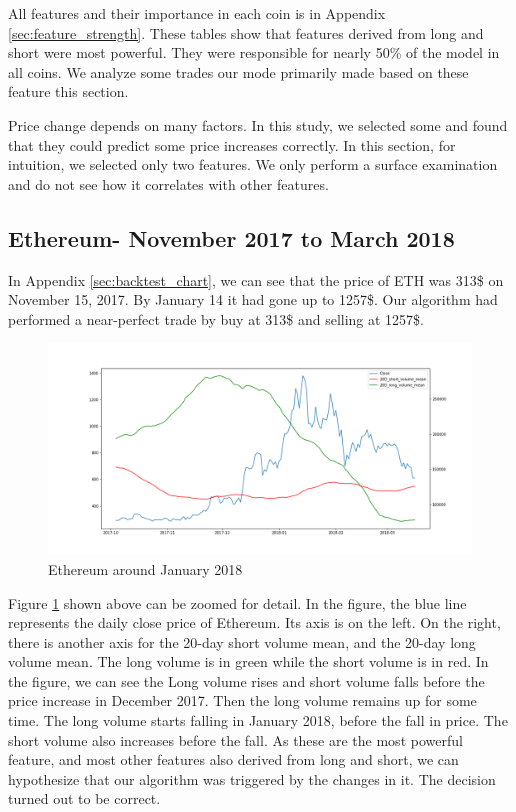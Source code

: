 \documentclass[letterpaper]{article}
\begin{document}
All features and their importance in each coin is in Appendix \ref{sec:feature_strength}. 
These tables show that features derived from long and short were most powerful.
They were responsible for nearly 50\% of the model in all coins. We analyze 
some trades our mode primarily made based on these feature this section. \par


Price change depends on many factors. In this study, we selected some and found that they could predict 
some price increases correctly. In this section, for intuition, we selected only two features. 
We only perform a surface examination and do not see how it correlates with other features. 

\subsection{Ethereum- November 2017 to March 2018}
\label{sec:jan_ethereum}
In Appendix \ref{sec:backtest_chart}, we can see that the price of ETH was 313\$ on November 15, 2017. By January 
14 it had gone up to 1257\$. Our algorithm had performed a near-perfect trade by buy at 313\$ and 
selling at 1257\$. 

\begin{figure}[h!]
    \includegraphics[width=\linewidth]{images/case1.png}
    \caption{Ethereum around January 2018}
    \label{fig:eth_jan}
\end{figure}

Figure \ref{fig:eth_jan} shown above can be zoomed for detail. In the figure, the blue line represents the daily
close price of Ethereum. Its axis is on the left. On the right, there is another axis for the 20-day short volume 
mean, and the 20-day long volume mean. The long volume is in green while the short volume is in red. In the 
figure, we can see the Long volume rises and short volume falls before the price increase in December 2017.
Then the long volume remains up for some time. The long volume starts falling in January 2018, before the fall in price. The 
short volume also increases before the fall. As these are the most powerful feature, and most other features 
also derived from long and short, we can hypothesize that our 
algorithm was triggered by the changes in it. The decision turned out to be correct. 
\end{document}
